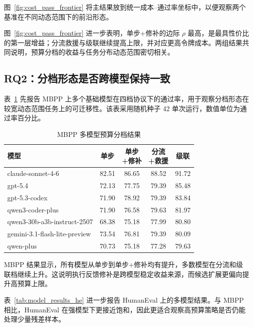 图~\ref{fig:cost_pass_frontier} 将主结果放到统一成本--通过率坐标中，以便观察两个基准在不同动态范围下的前沿形态。



图~\ref{fig:cost_pass_frontier} 进一步表明，单步+修补的边际 $\rho$ 最高，是最具性价比的第一层增益；分流救援与级联继续提高上限，并对应更高令牌成本。两组结果共同说明，预算分档的收益与任务分布动态范围密切相关。

\subsection{RQ2：分档形态是否跨模型保持一致}
\label{sec:rq2}

表~\ref{tab:model_results_mbpp} 先报告 MBPP 上多个基础模型在四档协议下的通过率，用于观察分档形态在较宽动态范围任务上的可迁移性。该表采用随机种子 42 单次运行，数值单位为通过率百分比。

\begin{table}[H]
\centering
\scriptsize
\caption{MBPP 多模型预算分档结果}
\label{tab:model_results_mbpp}
\begin{tabularx}{\linewidth}{>{\raggedright\arraybackslash}X c c c c}
\toprule
模型 & 单步 & \makecell{单步\\+修补} & \makecell{分流\\+救援} & 级联 \\
\midrule
claude-sonnet-4-6 & 82.51 & 86.65 & 88.52 & 91.72 \\
gpt-5.4 & 72.13 & 77.75 & 79.39 & 85.48 \\
gpt-5.3-codex & 71.90 & 78.92 & 79.39 & 83.84 \\
qwen3-coder-plus & 71.90 & 76.58 & 79.63 & 81.97 \\
qwen3-30b-a3b-instruct-2507 & 68.38 & 75.18 & 77.99 & 80.80 \\
gemini-3.1-flash-lite-preview & 73.54 & 76.81 & 79.39 & 80.09 \\
qwen-plus & 70.73 & 75.18 & 77.28 & 79.63 \\
\bottomrule
\end{tabularx}
\end{table}

MBPP 结果显示，所有模型从单步到单步+修补均有提升，多数模型在分流和级联档继续上升。这说明执行反馈修补是跨模型稳定收益来源，而候选扩展更偏向提升高预算上限。

表~\ref{tab:model_results_he} 进一步报告 HumanEval 上的多模型结果。与 MBPP 相比，HumanEval 在强模型下更接近饱和，因此更适合观察高预算策略是否仍能处理少量残差样本。


